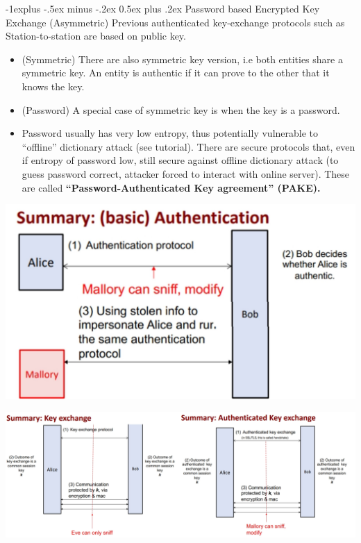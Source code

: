 \documentclass[10pt, landscape]{article}
\makeatletter
\renewcommand{\subsection}{\@startsection{subsection}{2}{0mm}%
                                {-1explus -.5ex minus -.2ex}%
                                {0.5ex plus .2ex}%
                                {\normalfont\normalsize\bfseries}}
\makeatother
\begin{document}
\begin{multicols*}{3}
\subsection{Password based Encrypted Key Exchange}
(Asymmetric) Previous authenticated key-exchange protocols such as Station-to-station are based on public key. 
\begin{itemize}
\item (Symmetric) There are also symmetric key version, i.e both entities share a symmetric key. An entity is authentic if it can prove to the other that it knows the key.
\item (Password) A special case of symmetric key is when the key is a password.
\item Password usually has very low entropy, thus potentially vulnerable to “offline” dictionary attack (see tutorial). There are secure protocols that, 
even if entropy of password low, still secure against offline dictionary attack (to guess password correct, attacker forced to interact with online server). These are called \textbf{“Password-Authenticated Key agreement” (PAKE).}
\end{itemize}

\centerline{\includegraphics[width=0.8\linewidth]{authSummary4}}	
\medskip
\centerline{\includegraphics[width=1\linewidth]{authSummary5}}	





\end{multicols*}
\end{document}
